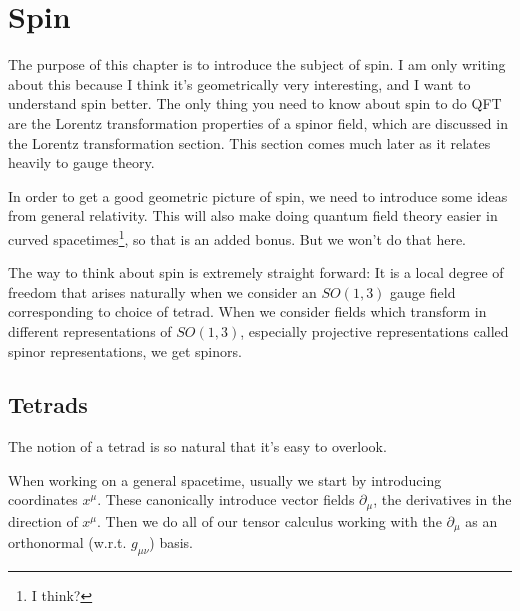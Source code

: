 \documentclass[main.tex]{subfiles}
\begin{document}
\chapter{Spin}

The purpose of this chapter is to introduce the subject of spin. I am only writing about this because I think it's geometrically very interesting, and I want to understand spin better. The only thing you need to know about spin to do QFT are the Lorentz transformation properties of a spinor field, which are discussed in the Lorentz transformation section. This section comes much later as it relates heavily to gauge theory.

In order to get a good geometric picture of spin, we need to introduce some ideas from general relativity. This will also make doing quantum field theory easier in curved spacetimes\footnote{I think?}, so that is an added bonus. But we won't do that here. 

The way to think about spin is extremely straight forward: It is a local degree of freedom that arises naturally when we consider an $SO(1,3)$ gauge field corresponding to choice of tetrad. When we consider fields which transform in different representations of $SO(1,3)$, especially projective representations called spinor representations, we get spinors.

\section{Tetrads}
The notion of a tetrad is so natural that it's easy to overlook.

When working on a general spacetime, usually we start by introducing coordinates $x^\mu$. These canonically introduce vector fields $\partial_\mu$, the derivatives in the direction of $x^\mu$. Then we do all of our tensor calculus working with the $\partial_\mu$ as an orthonormal (w.r.t. $g_{\mu \nu}$) basis. 
\end{document}
